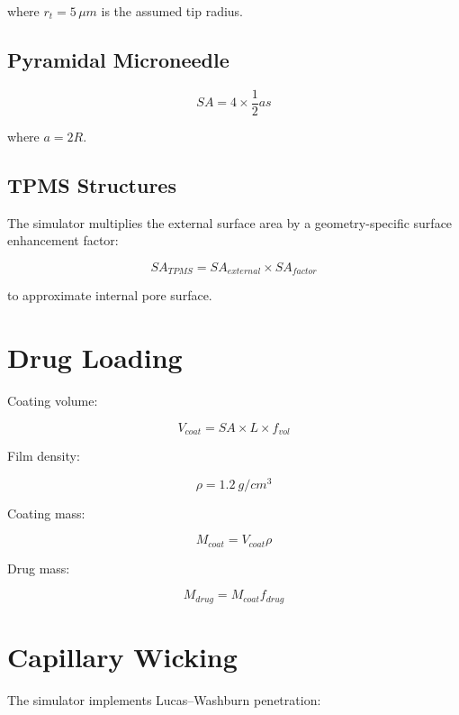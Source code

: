 \documentclass[11pt]{article}
\begin{document}
where $r_t=5\,\mu m$ is the assumed tip radius.

\subsection{Pyramidal Microneedle}

\begin{equation}
SA = 4 \times \frac12 a s
\end{equation}

where $a=2R$.

\subsection{TPMS Structures}

The simulator multiplies the external surface area by a geometry-specific surface enhancement factor:

\begin{equation}
SA_{TPMS}=SA_{external}\times SA_{factor}
\end{equation}

to approximate internal pore surface.

\section{Drug Loading}

Coating volume:

\begin{equation}
V_{coat}=SA\times L\times f_{vol}
\end{equation}

Film density:

\begin{equation}
\rho =1.2\ g/cm^3
\end{equation}

Coating mass:

\begin{equation}
M_{coat}=V_{coat}\rho
\end{equation}

Drug mass:

\begin{equation}
M_{drug}=M_{coat}f_{drug}
\end{equation}

\section{Capillary Wicking}

The simulator implements Lucas--Washburn penetration:
\end{document}
